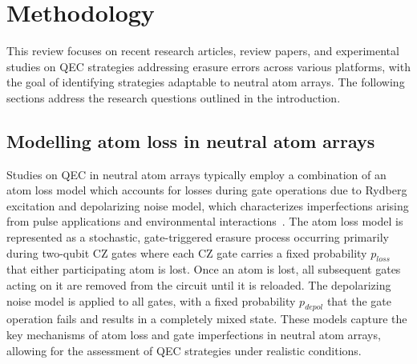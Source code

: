 \documentclass[aps,prb,twocolumn,superscriptaddress,nobibnotes]{revtex4-2} %
\begin{document}
\section{Methodology}
This review focuses on recent research articles, review papers, and experimental studies on QEC strategies addressing erasure errors across various platforms, with the goal of identifying strategies adaptable to neutral atom arrays.
The following sections address the research questions outlined in the introduction.


\subsection{Modelling atom loss in neutral atom arrays}
Studies on QEC in neutral atom arrays typically employ a combination of an atom loss model which accounts for losses during gate operations due to Rydberg excitation and depolarizing noise model, which characterizes imperfections arising from pulse applications and environmental interactions~\cite{Perrin_2025}.
The atom loss model is represented as a stochastic, gate-triggered erasure process occurring primarily during two-qubit CZ gates where each CZ gate carries a fixed probability $p_{loss}$ that either participating atom is lost. 
Once an atom is lost, all subsequent gates acting on it are removed from the circuit until it is reloaded.
The depolarizing noise model is applied to all gates, with a fixed probability $p_{depol}$ that the gate operation fails and results in a completely mixed state.
These models capture the key mechanisms of atom loss and gate imperfections in neutral atom arrays, allowing for the assessment of QEC strategies under realistic conditions.
\end{document}
